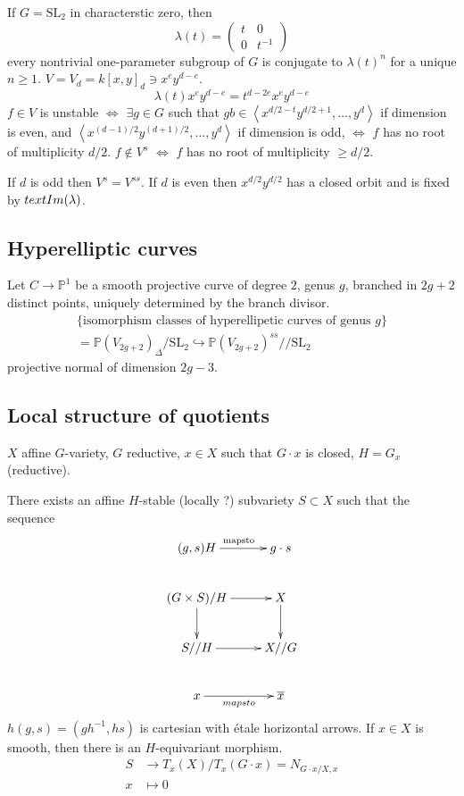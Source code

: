 \begin{example}
\label{example-stable-points-for-SL2-acting-on-degree-d-polynomials}
If $G=\text{SL}_2$ in characterstic zero, then
$$
\lambda(t)=\begin{pmatrix}
t&0\\ 
0&t^{-1}
\end{pmatrix}
$$
every nontrivial one-parameter subgroup of $G$ is conjugate to $\lambda(t)^n$
for a unique $n \geq 1$. $V=V_d=k[x,y]_d\ni x^e y^{d-e}$.
$$
\lambda(t) x^e y^{d-e}=t^{d-2e}x^ey^{d-e}
$$
$f \in V$ is unstable $\iff$ $\exists g \in G$ such that $gb \in \left<
x^{d/2-t}y^{d/2+1},\ldots, y^d\right>$ if dimension is even, and $
\left<x^{(d-1)/2}y^{(d+1)/2},\ldots, y^d\right>$ if dimension is odd, $\iff$
$f$ has no root of multiplicity $d/2$. $f \not \in V^s$ $\iff$ $f$ has no root
of multiplicity $\geq d/2$.

If $d$ is odd then $V^s=V^{ss}$. If $d$ is even then $x^{d/2}y^{d/2}$ has a
closed orbit and is fixed by $\\text{Im}(\lambda)$.
\end{example}

\subsection*{Hyperelliptic curves}
\label{subsection-hyperelliptic-curves}

Let $C \to \mathbb{P}^1$ be a smooth projective curve of degree $2$, genus $g$,
branched in $2g+2$ distinct points, uniquely determined by the branch divisor.
\begin{gather*}
\{\text{isomorphism classes of hyperellipetic curves of genus $g$}\}\\
=\mathbb{P}(V_{2g+2})_\Delta/\text{SL}_2 \hookrightarrow
\mathbb{P}(V_{2g+2})^{ss}//\text{SL}_2
\end{gather*}
projective normal of dimension $2g-3$.

\subsection*{Local structure of quotients}
\label{subsection-local-structure-of-quotients}
$X$ affine $G$-variety, $G$ reductive, $x\in X$ such that $G\cdot x$ is closed,
$H=G_x$ (reductive).

\begin{theorem}
\label{theorem-}
There exists an affine $H$-stable (locally ?) subvariety $S \subset X$ such that
the sequence
$$
\xymatrix{
(g,s)H\ar[r]^{\text{mapsto}}&g\cdot s\\
(G\times S)/H\ar[d]\ar[r]&  X\ar[d]\\
S//H\ar[r]&  X//G\\
x\ar[r]_{mapsto} &\overline{x}
}
$$
$h(g,s)=(gh^{-1},hs)$ is cartesian with étale horizontal arrows. If $x \in X$ is
smooth, then there is an $H$-equivariant morphism.
\begin{align*}
S &\longrightarrow T_x(X)/T_x(G\cdot x)=N_{G\cdot x/X,x} \\
x &\longmapsto 0
\end{align*}
\end{theorem}

